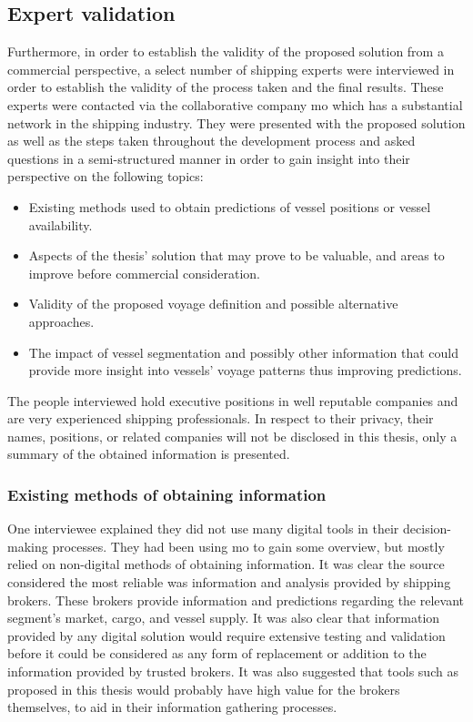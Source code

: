 \subsection{Expert validation}

Furthermore, in order to establish the validity of the proposed solution from a commercial perspective, a select number of shipping experts were interviewed in order to establish the validity of the process taken and the final results. These experts were contacted via the collaborative company \acrfull{mo} which has a substantial network in the shipping industry. They were presented with the proposed solution as well as the steps taken throughout the development process and asked questions in a semi-structured manner in order to gain insight into their perspective on the following topics:

\begin{itemize}
    \item Existing methods used to obtain predictions of vessel positions or vessel availability.
    \item Aspects of the thesis' solution that may prove to be valuable, and areas to improve before commercial consideration.
    \item Validity of the proposed voyage definition and possible alternative approaches.
    \item The impact of vessel segmentation and possibly other information that could provide more insight into vessels' voyage patterns thus improving predictions.
\end{itemize}

The people interviewed hold executive positions in well reputable companies and are very experienced shipping professionals. In respect to their privacy, their names, positions, or related companies will not be disclosed in this thesis, only a summary of the obtained information is presented.

\subsubsection{Existing methods of obtaining information}

One interviewee explained they did not use many digital tools in their decision-making processes. They had been using \acrfull{mo} to gain some overview, but mostly relied on non-digital methods of obtaining information. It was clear the source considered the most reliable was information and analysis provided by shipping brokers. These brokers provide information and predictions regarding the relevant segment's market, cargo, and vessel supply. It was also clear that information provided by any digital solution would require extensive testing and validation before it could be considered as any form of replacement or addition to the information provided by trusted brokers. It was also suggested that tools such as proposed in this thesis would probably have high value for the brokers themselves, to aid in their information gathering processes.


